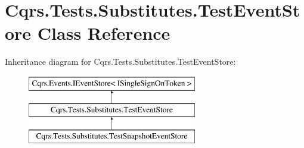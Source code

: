 \hypertarget{classCqrs_1_1Tests_1_1Substitutes_1_1TestEventStore}{}\section{Cqrs.\+Tests.\+Substitutes.\+Test\+Event\+Store Class Reference}
\label{classCqrs_1_1Tests_1_1Substitutes_1_1TestEventStore}
Inheritance diagram for Cqrs.\+Tests.\+Substitutes.\+Test\+Event\+Store\+:\begin{figure}[H]
\begin{center}
\leavevmode
\includegraphics[height=3.000000cm]{classCqrs_1_1Tests_1_1Substitutes_1_1TestEventStore}
\end{center}
\end{figure}
